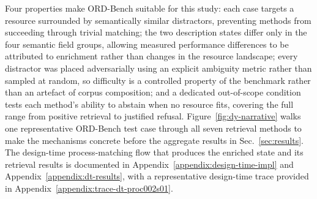 \documentclass[10pt,twocolumn]{article}
\begin{document}

Four properties make ORD-Bench suitable for this study: each case targets a resource surrounded by semantically similar distractors, preventing methods from succeeding through trivial matching; the two description states differ only in the four semantic field groups, allowing measured performance differences to be attributed to enrichment rather than changes in the resource landscape; every distractor was placed adversarially using an explicit ambiguity metric rather than sampled at random, so difficulty is a controlled property of the benchmark rather than an artefact of corpus composition; and a dedicated out-of-scope condition tests each method's ability to abstain when no resource fits, covering the full range from positive retrieval to justified refusal. Figure~\ref{fig:dy-narrative} walks one representative ORD-Bench test case through all seven retrieval methods to make the mechanisms concrete before the aggregate results in Sec.~\ref{sec:results}. The design-time process-matching flow that produces the enriched state and its retrieval results is documented in Appendix~\ref{appendix:design-time-impl} and Appendix~\ref{appendix:dt-results}, with a representative design-time trace provided in Appendix~\ref{appendix:trace-dt-proc002s01}.
\end{document}
